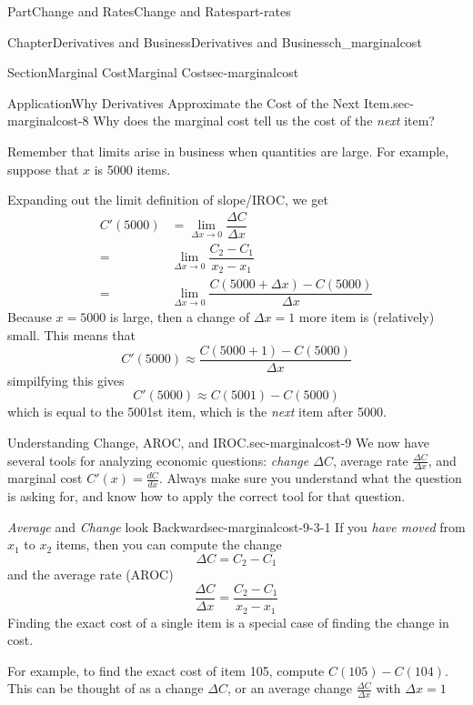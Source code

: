 \documentclass{tufte-book}
\numberwithin{equation}{chapter}
\newcommand{\amp}{&}
\begin{document}
\begin{partptx}{Part}{Change and Rates}{}{Change and Rates}{}{}{part-rates}
\begin{chapterptx}{Chapter}{Derivatives and Business}{}{Derivatives and Business}{}{}{ch_marginalcost}
\begin{sectionptx}{Section}{Marginal Cost}{}{Marginal Cost}{}{}{sec-marginalcost}
\begin{insight}{Application}{Why Derivatives Approximate the Cost of the Next Item.}{sec-marginalcost-8}
Why does the marginal cost tell us the cost of the \emph{next} item?%
\par
Remember that limits arise in business when quantities are large.  For example, suppose that \(x\) is 5000 items.%
\par
Expanding out the limit definition of slope\slash{}IROC, we get%
\begin{align*}
C'(5000) \amp = \lim_{\Delta x \rightarrow 0}\dfrac{\Delta C}{\Delta x} \\
= \amp \lim_{\Delta x \rightarrow 0} \dfrac{C_2 - C_1}{x_2 - x_1}\\
= \amp \lim_{\Delta x \rightarrow 0} \dfrac{C(5000 + \Delta x) - C(5000)}{\Delta x}
\end{align*}
Because \(x=5000\) is large, then a change of \(\Delta x=1\) more item is (relatively) small. This means that%
\begin{equation*}
C'(5000) \approx  \dfrac{C(5000 + 1) - C(5000)}{\Delta x}
\end{equation*}
simpilfying this gives%
\begin{equation*}
C'(5000) \approx  C(5001) - C(5000) 
\end{equation*}
which is equal to the 5001st item, which is the \emph{next} item after 5000.%
\end{insight}
\begin{paragraphs}{Understanding Change, AROC, and IROC.}{sec-marginalcost-9}%
We now have several tools for analyzing economic questions: \emph{change \(\Delta C\)}, average rate \(\frac{\Delta C}{\Delta x}\), and marginal cost \(C'(x) = \frac{dC}{dx}\). Always make sure you understand what the question is asking for, and know how to apply the correct tool for that question.%
%
\begin{descriptionlist}
\begin{dlimedium}{\emph{Average} and \emph{Change} look Backward}{sec-marginalcost-9-3-1}%
If you \emph{have moved} from \(x_1\) to \(x_2\) items, then you can compute the change%
\begin{equation*}
\Delta C = C_2 - C_1 
\end{equation*}
and the average rate (AROC)%
\begin{equation*}
\frac{\Delta C}{\Delta x} = \dfrac{C_2 - C_1}{x_2-x_1}
\end{equation*}
Finding the exact cost of a single item is a special case of finding the change in cost.%
\par
For example, to find the exact cost of item 105, compute \(C(105)-C(104)\).  This can be thought of as a change \(\Delta C\), or an average change \(\frac{\Delta C}{\Delta x}\) with \(\Delta x=1\)%

\end{dlimedium}
\end{descriptionlist}
\end{paragraphs}
\end{sectionptx}
\end{chapterptx}
\end{partptx}
\end{document}
